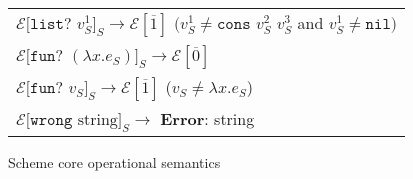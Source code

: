 \begin{figure}[ph!]
\begin{tabular}{l}
$\mathscr{E}[\mathtt{list?}$ $v_{S}^{1}]_{S}\rightarrow\mathscr{E}[\overline{1}]$ $(v_{S}^{1}\neq\mathtt{cons}$ $v_{S}^{2}$ $v_{S}^{3}$ and $v_{S}^{1}\neq\mathtt{nil})$ \\

\vspace{5pt}

$\mathscr{E}[\mathtt{fun?}$ $(\lambda x.e_{S})]_{S}\rightarrow\mathscr{E}[\overline{0}]$ \\

\vspace{5pt}

$\mathscr{E}[\mathtt{fun?}$ $v_{S}]_{S}\rightarrow\mathscr{E}[\overline{1}]$ ($v_{S}\neq\lambda x.e_{S}$) \\

\vspace{5pt}

$\mathscr{E}[\mathtt{wrong}$ $\mathrm{string}]_{S}\rightarrow$ \textbf{Error}: string
\end{tabular}
\caption{Scheme core operational semantics}
\label{scos}
\end{figure}